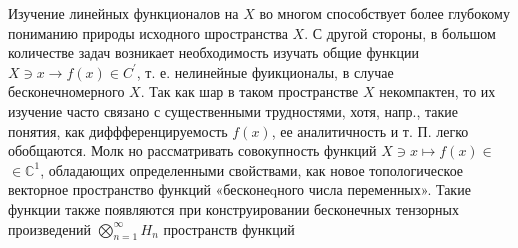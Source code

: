 \documentclass[10pt]{article}
\begin{document}
Изучение линейных функционалов на $X$ во многом способствует более глубокому пониманию природы исходного шространства $X$. С другой стороны, в большом количестве задач возникает необходимость изучать общие функции $X \ni x \rightarrow f(x) \in C^{\prime}$, т. е. нелинейные фуикционалы, в случае бесконечномерного $X$. Так как шар в таком пространстве $X$ некомпактен, то их изучение часто связано с существенными трудностями, хотя, напр., такие понятия, как диффференцируемость $f(x)$, ее аналитичность и т. П. легко обобщаются. Молк но рассматривать совокупность функций $X \ni x \mapsto f(x) \in$ $\in \mathbb{C}^{1}$, обладающих определенными свойствами, как новое топологическое векторное пространство функций «бесконеqного числа переменных». Такие функции также появляются при конструировании бесконечных тензорных произведений $\bigotimes_{n=1}^{\infty} H_{n}$ пространств функций
\end{document}
